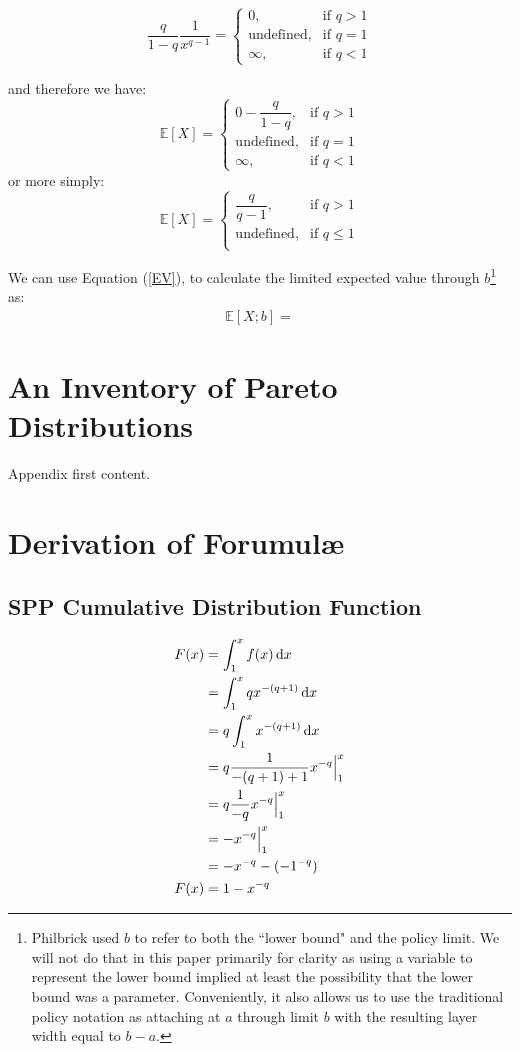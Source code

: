 \documentclass[]{article} %
\begin{document}
\[
    \frac{q}{1-q} \dfrac{1}{x^{q-1}} = 
\begin{cases}
    0,& \text{if } q > 1\\
    \text{undefined},& \text{if } q = 1\\         
    \infty, & \text{if }q < 1
\end{cases}
\]

and therefore we have: 
\[
    \mathbb{E}[X]  = 
\begin{cases}
    0 - \dfrac{q}{1-q},& \text{if } q > 1\\
    \text{undefined},& \text{if } q = 1\\         
    \infty, & \text{if }q < 1
\end{cases}
\]
or more simply:
\[
    \mathbb{E}[X]  = 
\begin{cases}
    \dfrac{q}{q-1},& \text{if } q > 1\\
    \text{undefined},& \text{if } q \leq 1\\         
\end{cases}
\]

We can use Equation (\ref{EV}), to calculate the limited expected value through $b$\footnote{Philbrick used $b$ to refer to both the ``lower bound" and the policy limit. We will not do that in this paper primarily for clarity as using a variable to represent the lower bound implied at least the possibility that the lower bound was a parameter. Conveniently, it also allows us  to use the traditional policy notation as attaching at $a$ through limit $b$ with the resulting layer width equal to $b - a$.} as:
\begin{align}
	\mathbb{E}[X;b] = 
\end{align}
\newpage
\appendix
\appendixpage

\section{An Inventory of Pareto Distributions}\label{ParetoInventory}
Appendix first content.
\section{Derivation of Forumul\ae}
\subsection{SPP Cumulative Distribution Function}\label{ParetoF}
\begin{align}
	F(x) &= \int_{1}^{x} f(x) \operatorname{d \!} x \nonumber\\
		&= \int_{1}^{x}qx^{-(q+1)} \operatorname{d \!} x\nonumber\\
		&= q \int_{1}^{x}x^{-(q+1)} \operatorname{d \!} x\nonumber\\
		&= q \frac{1}{-(q+1)+1} x^{-q} \Big|_{1}^{x}\nonumber\\
		&=  q \frac{1}{-q} x^{-q} \Big|_{1}^{x}\nonumber\\
		&=  - x^{-q}\Big|_{1}^{x}\nonumber\\
		&= -x^{-q} - (-1^{-q})\nonumber\\
	 F(x) &=  1 - x^{-q}
\end{align}
\end{document}

